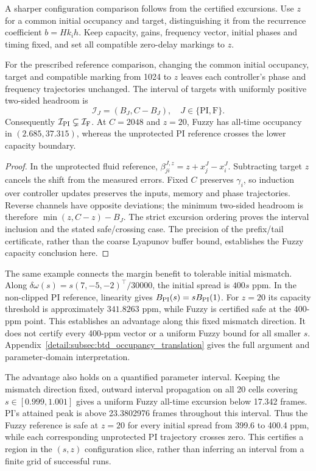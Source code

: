A sharper configuration comparison follows from the certified
excursions. Use $z$ for a common initial occupancy and target,
distinguishing it from the recurrence coefficient $b=Hk_ih$.
Keep capacity, gains, frequency vector, initial phases and timing
fixed, and set all compatible zero-delay markings to $z$.

\begin{btdcorollary}
\label{cor:btd_occupancy_advantage}
For the prescribed reference comparison, changing the common initial
occupancy, target and compatible marking from 1024 to $z$ leaves
each controller's phase and frequency trajectories unchanged.
The interval of targets with uniformly positive two-sided headroom is
\begin{equation}
 \mathcal I_J=(B_J,C-B_J),\quad J\in\{\mathrm{PI},\mathrm F\}.
 \label{eq:btd_target_interval}
\end{equation}
Consequently $\mathcal I_{\rm PI}\subsetneq\mathcal I_{\rm F}$.
At $C=2048$ and $z=20$, Fuzzy has all-time occupancy in
$(2.685,37.315)$, whereas the unprotected PI reference crosses
the lower capacity boundary.
\end{btdcorollary}
\begin{proof}
In the unprotected fluid reference,
$\beta_{ji}^{J,z}=z+x_j^J-x_i^J$.
Subtracting target $z$ cancels the shift from the measured errors.
Fixed $C$ preserves $\gamma_i$, so induction over controller updates
preserves the inputs, memory and phase trajectories. Reverse channels
have opposite deviations; the minimum two-sided headroom is therefore
$\min(z,C-z)-B_J$. The strict excursion ordering proves the interval
inclusion and the stated safe/crossing case. The precision of the
prefix/tail certificate, rather than the coarse Lyapunov buffer
bound, establishes the Fuzzy capacity conclusion here.
\end{proof}

The same example connects the margin benefit to tolerable initial
mismatch. Along $\delta\omega(s)=s(7,-5,-2)^\top/30000$, the
initial spread is $400s$ ppm. In the non-clipped PI reference,
linearity gives $B_{\rm PI}(s)=sB_{\rm PI}(1)$. For $z=20$ its
capacity threshold is approximately $341.8263$ ppm, while Fuzzy
is certified safe at the 400-ppm point. This establishes an advantage
along this fixed mismatch direction. It does not certify every
400-ppm vector or a uniform Fuzzy bound for all smaller $s$.
Appendix~\ref{detail:subsec:btd_occupancy_translation} gives the full
argument and parameter-domain interpretation.

The advantage also holds on a quantified parameter interval. Keeping
the mismatch direction fixed, outward interval propagation on all
20 cells covering $s\in[0.999,1.001]$ gives a uniform Fuzzy
all-time excursion below 17.342 frames. PI's attained peak is above
23.3802976 frames throughout this interval. Thus the Fuzzy reference
is safe at $z=20$ for every initial spread from 399.6 to 400.4 ppm,
while each corresponding unprotected PI trajectory crosses zero.
This certifies a region in the $(s,z)$ configuration slice, rather
than inferring an interval from a finite grid of successful runs.


